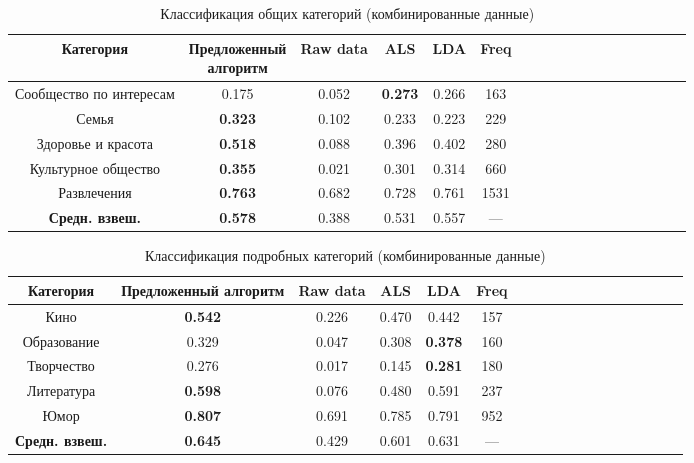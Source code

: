 \documentclass[times,specification,annotation]{itmo-student-thesis}
\begin{document}
\begin{table}[!h]
\caption{Классификация общих категорий (комбинированные данные)}\label{tab-combined-g}
\centering
\begin{tabular}{|*{18}{c|}}\hline
Категория & \thead{Предложенный \\  алгоритм} & Raw data & ALS & LDA & Freq \\\hline
Сообщество по интересам           & 0.175 & 0.052 & \textbf{0.273} & 0.266 & 163 \\\hline
Семья           & \textbf{0.323} & 0.102 & 0.233 & 0.223 & 229 \\\hline
Здоровье и красота            & \textbf{0.518} & 0.088 & 0.396 & 0.402 & 280  \\\hline
Культурное общество           & \textbf{0.355} & 0.021 & 0.301 & 0.314 & 660 \\\hline
Развлечения            & \textbf{0.763} & 0.682 & 0.728 & 0.761 & 1531 \\\hline
\textbf{Средн. взвеш. } & \textbf{0.578} & 0.388 & 0.531 & 0.557 & --- \\\hline
\end{tabular}
\end{table}

\begin{table}[!h]
\caption{Классификация подробных категорий (комбинированные данные)}\label{tab-combined-d}
\centering
\begin{tabular}{|*{18}{c|}}\hline
Категория & Предложенный алгоритм  & Raw data & ALS & LDA & Freq \\\hline
Кино            & \textbf{0.542} & 0.226 & 0.470 & 0.442 & 157 \\\hline
Образование           & 0.329 & 0.047 & 0.308 & \textbf{0.378} & 160 \\\hline
Творчество            & 0.276 & 0.017 & 0.145 & \textbf{0.281} & 180 \\\hline
Литература          & \textbf{0.598} & 0.076 & 0.480 & 0.591 & 237  \\\hline
Юмор           & \textbf{0.807} & 0.691 & 0.785 & 0.791 & 952 \\\hline
\textbf{Средн. взвеш.}  & \textbf{0.645} & 0.429 & 0.601 & 0.631 & --- \\\hline
\end{tabular}
\end{table}
\end{document}
